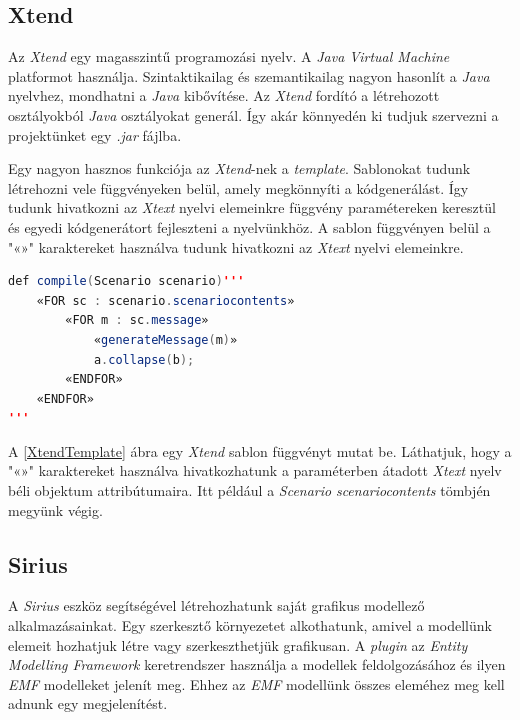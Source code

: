 \subsection{Xtend}

Az \textit{Xtend} \cite{Xtend} egy magasszintű programozási nyelv.
A \textit{Java Virtual Machine} platformot használja.
Szintaktikailag és szemantikailag nagyon hasonlít a \textit{Java} nyelvhez, mondhatni a \textit{Java} kibővítése.
Az \textit{Xtend} fordító a létrehozott osztályokból \textit{Java} osztályokat generál.
Így akár könnyedén ki tudjuk szervezni a projektünket egy \textit{.jar} fájlba.

Egy nagyon hasznos funkciója az \textit{Xtend}-nek a \textit{template}.
Sablonokat tudunk létrehozni vele függvényeken belül, amely megkönnyíti a kódgenerálást.
Így tudunk hivatkozni az \textit{Xtext} nyelvi elemeinkre függvény paramétereken keresztül és egyedi kódgenerátort fejleszteni a nyelvünkhöz.
A sablon függvényen belül a "«»" karaktereket használva tudunk hivatkozni az \textit{Xtext} nyelvi elemeinkre.

\begin{lstlisting}[language=java, frame=single, float=ht!, caption={Xtend template.},captionpos=b, label=XtendTemplate]
def compile(Scenario scenario)'''
	«FOR sc : scenario.scenariocontents»
		«FOR m : sc.message»
			«generateMessage(m)»
			a.collapse(b);
		«ENDFOR»
	«ENDFOR»
'''
\end{lstlisting}

A \ref{XtendTemplate} ábra egy \textit{Xtend} sablon függvényt mutat be.
Láthatjuk, hogy a "«»" karaktereket használva hivatkozhatunk a paraméterben átadott \textit{Xtext} nyelv béli objektum attribútumaira.
Itt például a \textit{Scenario} \textit{scenariocontents} tömbjén megyünk végig.

\subsection{Sirius}

A \textit{Sirius} \cite{Sirius} eszköz segítségével létrehozhatunk saját grafikus modellező alkalmazásainkat.
Egy szerkesztő környezetet alkothatunk, amivel a modellünk elemeit hozhatjuk létre vagy szerkeszthetjük grafikusan.
A \textit{plugin} az \textit{Entity Modelling Framework} \cite{EMF} keretrendszer használja a modellek feldolgozásához és ilyen \textit{EMF} modelleket jelenít meg.
Ehhez az \textit{EMF} modellünk összes eleméhez meg kell adnunk egy megjelenítést.


